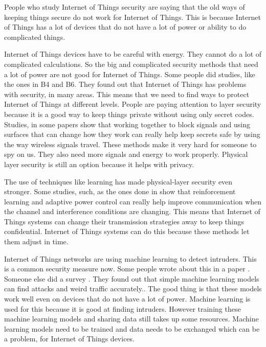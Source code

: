 \documentclass[a4paper,fleqn]{cas-dc}
\numberwithin{equation}{section}
\begin{document}
People who study Internet of Things security are saying that the old ways of keeping things secure do not work for Internet of Things. This is because Internet of Things has a lot of devices that do not have a lot of power or ability to do complicated things.

Internet of Things devices have to be careful with energy. They cannot do a lot of complicated calculations. So the big and complicated security methods that need a lot of power are not good for Internet of Things. Some people did studies, like the ones in B4 and B6. They found out that Internet of Things has problems with security, in many areas. This means that we need to find ways to protect Internet of Things at different levels.
People are paying attention to layer security because it is a good way to keep things private without using only secret codes. Studies, in some papers show that working together to block signals and using surfaces that can change how they work can really help keep secrets safe by using the way wireless signals travel. These methods make it very hard for someone to spy on us. They also need more signals and energy to work properly. Physical layer security is still an option because it helps with privacy.

The use of techniques like learning has made physical-layer security even stronger. Some studies, such, as the ones done in \cite{zhang2025dlids} show that reinforcement learning and adaptive power control can really help improve communication when the channel and interference conditions are changing. This means that Internet of Things systems can change their transmission strategies away to keep things confidential. Internet of Things systems can do this because these methods let them adjust in time.

Internet of Things networks are using machine learning to detect intruders. This is a common security measure now. Some people wrote about this in a paper \cite{mustafa2025ml2}. Someone else did a survey \cite{mustafa2025securearch}. They found out that simple machine learning models can find attacks and weird traffic accurately.. The good thing is that these models work well even on devices that do not have a lot of power. Machine learning is used for this because it is good at finding intruders. However training these machine learning models and sharing data still takes up some resources. Machine learning models need to be trained and data needs to be exchanged which can be a problem, for Internet of Things devices.
\end{document}
